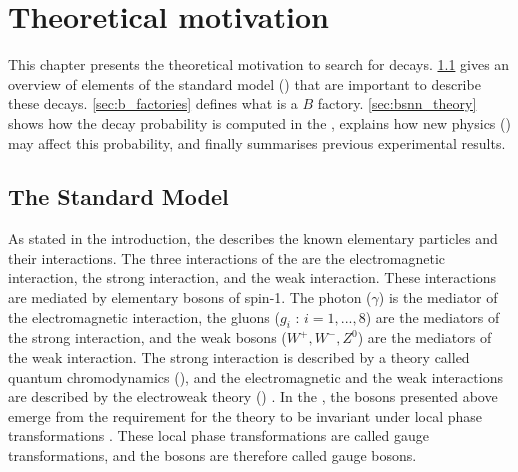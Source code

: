 \chapter{Theoretical motivation} \label{ch:theory}

This chapter presents the theoretical motivation to search for \BKnn decays.
\cref{sec:sm} gives an overview of elements of the standard model (\SM) that are important to describe these decays.
\cref{sec:b_factories}  defines what is a $B$ factory.
\cref{sec:bsnn_theory} shows how the \BKnn decay probability is computed in the \SM, explains how new physics (\NP) may affect this probability, and finally summarises previous experimental results.

\section{The Standard Model} \label{sec:sm}
As stated in the introduction, the \SM describes the known elementary particles and their interactions. 
The three interactions of the \SM are the electromagnetic interaction, the strong interaction, and the weak interaction.
These interactions are mediated by elementary bosons of spin-1.
The photon ($\gamma$) is the mediator of the electromagnetic interaction, the gluons ($g_i$ : $i=1,...,8$) are the mediators of the strong interaction, and the weak bosons ($W^+,W^-,Z^0$) are the mediators of the weak interaction.
The strong interaction is described by a theory called quantum chromodynamics (\QCD), and the electromagnetic and the weak interactions are described by the electroweak theory (\EW) \cite{Glashow:1961tr, Weinberg:1967tq,Salam:1968rm}.
In the \SM, the bosons presented above emerge from the requirement for the theory to be invariant under local phase transformations \cite{Aitchison:2004cs}.
These local phase transformations are called gauge transformations, and the bosons are therefore called gauge bosons.

